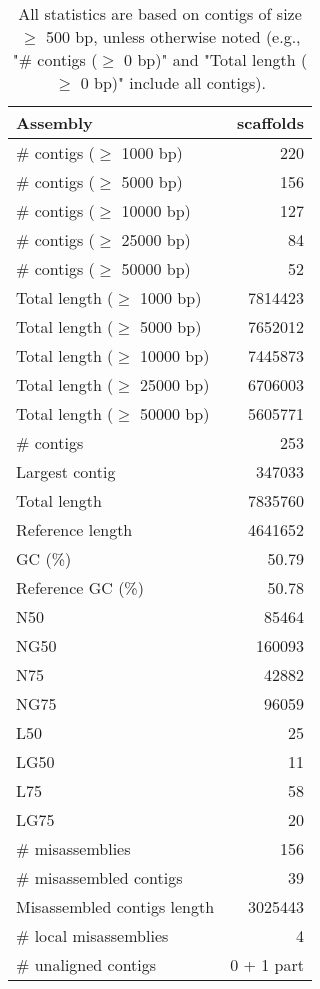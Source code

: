 \documentclass[12pt,a4paper]{article}
\begin{document}
\begin{table}[ht]
\begin{center}
\caption{All statistics are based on contigs of size $\geq$ 500 bp, unless otherwise noted (e.g., "\# contigs ($\geq$ 0 bp)" and "Total length ($\geq$ 0 bp)" include all contigs).}
\begin{tabular}{|l*{1}{|r}|}
\hline
Assembly & scaffolds \\ \hline
\# contigs ($\geq$ 1000 bp) & 220 \\ \hline
\# contigs ($\geq$ 5000 bp) & 156 \\ \hline
\# contigs ($\geq$ 10000 bp) & 127 \\ \hline
\# contigs ($\geq$ 25000 bp) & 84 \\ \hline
\# contigs ($\geq$ 50000 bp) & 52 \\ \hline
Total length ($\geq$ 1000 bp) & 7814423 \\ \hline
Total length ($\geq$ 5000 bp) & 7652012 \\ \hline
Total length ($\geq$ 10000 bp) & 7445873 \\ \hline
Total length ($\geq$ 25000 bp) & 6706003 \\ \hline
Total length ($\geq$ 50000 bp) & 5605771 \\ \hline
\# contigs & 253 \\ \hline
Largest contig & 347033 \\ \hline
Total length & 7835760 \\ \hline
Reference length & 4641652 \\ \hline
GC (\%) & 50.79 \\ \hline
Reference GC (\%) & 50.78 \\ \hline
N50 & 85464 \\ \hline
NG50 & 160093 \\ \hline
N75 & 42882 \\ \hline
NG75 & 96059 \\ \hline
L50 & 25 \\ \hline
LG50 & 11 \\ \hline
L75 & 58 \\ \hline
LG75 & 20 \\ \hline
\# misassemblies & 156 \\ \hline
\# misassembled contigs & 39 \\ \hline
Misassembled contigs length & 3025443 \\ \hline
\# local misassemblies & 4 \\ \hline
\# unaligned contigs & 0 + 1 part \\ \hline

\end{tabular}
\end{center}
\end{table}
\end{document}
